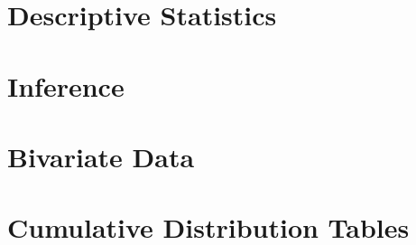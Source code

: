 \documentclass[12pt,twoside]{book}
\begin{document}
\chapter{Descriptive Statistics}

\chapter{Inference}

\chapter{Bivariate Data}




\appendix
\chapter{Cumulative Distribution Tables}

\end{document}

